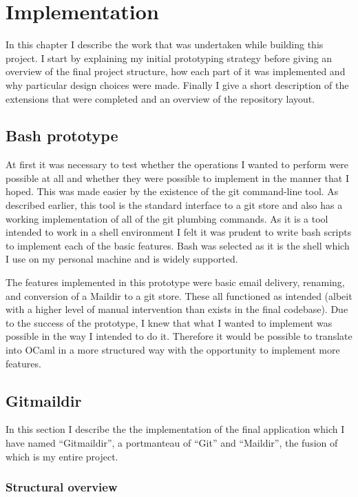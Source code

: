 \chapter{Implementation}

In this chapter I describe the work that was undertaken while building this project. I start by explaining my initial prototyping strategy before giving an overview of the final project structure, how each part of it was implemented and why particular design choices were made. Finally I give a short description of the extensions that were completed and an overview of the repository layout.

\section{Bash prototype}

At first it was necessary to test whether the operations I wanted to perform were possible at all and whether they were possible to implement in the manner that I hoped. This was made easier by the existence of the git command-line tool. As described earlier, this tool is the standard interface to a git store and also has a working implementation of all of the git plumbing commands. As it is a tool intended to work in a shell environment I felt it was prudent to write bash scripts to implement each of the basic features. Bash was selected as it is the shell which I use on my personal machine and is widely supported.

The features implemented in this prototype were basic email delivery, renaming, and conversion of a Maildir to a git store. These all functioned as intended (albeit with a higher level of manual intervention than exists in the final codebase). Due to the success of the prototype, I knew that what I wanted to implement was possible in the way I intended to do it. Therefore it would be possible to translate into OCaml in a more structured way with the opportunity to implement more features.

\section{Gitmaildir}

In this section I describe the the implementation of the final application which I have named ``Gitmaildir'', a portmanteau of ``Git'' and ``Maildir'', the fusion of which is my entire project.

\subsection{Structural overview} \label{section:structuraloverview}


